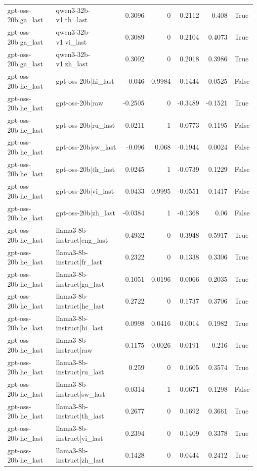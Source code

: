 \begin{table}
\begin{tabular}{l l r r r r l}
gpt-oss-20b|ga_last & qwen3-32b-v1|th_last & 0.3096 & 0 & 0.2112 & 0.408 & True \\
gpt-oss-20b|ga_last & qwen3-32b-v1|vi_last & 0.3089 & 0 & 0.2104 & 0.4073 & True \\
gpt-oss-20b|ga_last & qwen3-32b-v1|zh_last & 0.3002 & 0 & 0.2018 & 0.3986 & True \\
gpt-oss-20b|he_last & gpt-oss-20b|hi_last & -0.046 & 0.9984 & -0.1444 & 0.0525 & False \\
gpt-oss-20b|he_last & gpt-oss-20b|raw & -0.2505 & 0 & -0.3489 & -0.1521 & True \\
gpt-oss-20b|he_last & gpt-oss-20b|ru_last & 0.0211 & 1 & -0.0773 & 0.1195 & False \\
gpt-oss-20b|he_last & gpt-oss-20b|sw_last & -0.096 & 0.068 & -0.1944 & 0.0024 & False \\
gpt-oss-20b|he_last & gpt-oss-20b|th_last & 0.0245 & 1 & -0.0739 & 0.1229 & False \\
gpt-oss-20b|he_last & gpt-oss-20b|vi_last & 0.0433 & 0.9995 & -0.0551 & 0.1417 & False \\
gpt-oss-20b|he_last & gpt-oss-20b|zh_last & -0.0384 & 1 & -0.1368 & 0.06 & False \\
gpt-oss-20b|he_last & llama3-8b-instruct|eng_last & 0.4932 & 0 & 0.3948 & 0.5917 & True \\
gpt-oss-20b|he_last & llama3-8b-instruct|fr_last & 0.2322 & 0 & 0.1338 & 0.3306 & True \\
gpt-oss-20b|he_last & llama3-8b-instruct|ga_last & 0.1051 & 0.0196 & 0.0066 & 0.2035 & True \\
gpt-oss-20b|he_last & llama3-8b-instruct|he_last & 0.2722 & 0 & 0.1737 & 0.3706 & True \\
gpt-oss-20b|he_last & llama3-8b-instruct|hi_last & 0.0998 & 0.0416 & 0.0014 & 0.1982 & True \\
gpt-oss-20b|he_last & llama3-8b-instruct|raw & 0.1175 & 0.0026 & 0.0191 & 0.216 & True \\
gpt-oss-20b|he_last & llama3-8b-instruct|ru_last & 0.259 & 0 & 0.1605 & 0.3574 & True \\
gpt-oss-20b|he_last & llama3-8b-instruct|sw_last & 0.0314 & 1 & -0.0671 & 0.1298 & False \\
gpt-oss-20b|he_last & llama3-8b-instruct|th_last & 0.2677 & 0 & 0.1692 & 0.3661 & True \\
gpt-oss-20b|he_last & llama3-8b-instruct|vi_last & 0.2394 & 0 & 0.1409 & 0.3378 & True \\
gpt-oss-20b|he_last & llama3-8b-instruct|zh_last & 0.1428 & 0 & 0.0444 & 0.2412 & True \\

\end{tabular}
\end{table}

